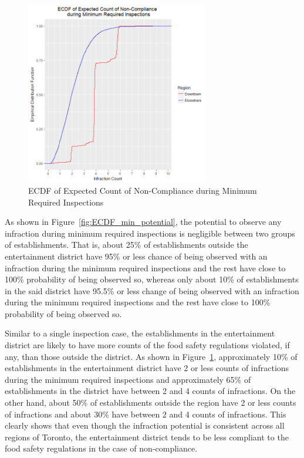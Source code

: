 \documentclass[twoside,onecolumn]{article}
\begin{document}
\begin{figure}[H]
\centering
\includegraphics[height=8cm]{ecdf_min_count}
\caption{ECDF of Expected Count of Non-Compliance during Minimum Required Inspections}
\label{fig:ECDF_min_count}
\end{figure}

As shown in Figure~\ref{fig:ECDF_min_potential}, the potential to observe any infraction during minimum required inspections is negligible between two groups of establishments. That is, about 25\% of establishments outside the entertainment district have 95\% or less chance of being observed with an infraction during the minimum required inspections and the rest have close to 100\% probability of being observed so, whereas only about 10\% of establishments in the said district have 95.5\% or less change of being observed with an infraction during the minimum required inspections and the rest have close to 100\% probability of being observed so. 

Similar to a single inspection case, the establishments in the entertainment district are likely to have more counts of the food safety regulations violated, if any, than those outside the district. As shown in  Figure~\ref{fig:ECDF_min_count}, approximately 10\% of establishments in the entertainment district have 2 or less counts of infractions during the minimum required inspections and approximately 65\% of establishments in the district have between 2 and 4 counts of infractions. On the other hand, about 50\% of establishments outside the region have 2 or less counts of infractions and about 30\% have between 2 and 4 counts of infractions. This clearly shows that even though the infraction potential is consistent across all regions of Toronto, the entertainment district tends to be less compliant to the food safety regulations in the case of non-compliance.
\end{document}
